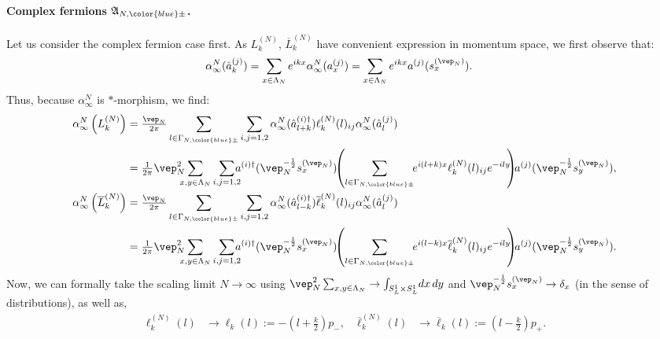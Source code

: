 \documentclass[a4paper, 11pt]{article}
\newcommand{\fA}{\mathfrak{A}}\newcommand{\cA}{\mathcal{A}}\newcommand{\dA}{\mathds{A}}\newcommand{\sA}{\mathscr{A}}
\DeclareMathOperator{\1}{\mathds{1}}
\begin{document}
\paragraph{Complex fermions $\fA_{N,{\color{blue}\pm}}$.}
Let us consider the complex fermion case first. As $L^{(N)}_{k}$, $\overline{L}^{(N)}_{k}$ have convenient expression in momentum space, we first observe that:
\begin{align}
\label{eq:rglimalgFT}
\alpha^{N}_{\infty}(\hat{a}^{(j)}_{k}) & = \sum_{x\in\Lambda_{N}}e^{ikx}\alpha^{N}_{\infty}(a^{(j)}_{x}) = \sum_{x\in\Lambda_{N}}e^{ikx}a^{(j)}(s^{(\vep_{N})}_{x}).
\end{align}
Thus, because $\alpha^{N}_{\infty}$ is $*$-morphism, we find:
\begin{align}
\label{eq:limrglatvira}
\alpha^{N}_{\infty}\left(L^{(N)}_{k}\right) & = \tfrac{\vep_{N}}{2\pi}\sum_{l\in\Gamma_{N,{\color{blue}\pm}}}\sum_{i,j=1,2}\alpha^{N}_{\infty}(\hat{a}^{(i)\dag}_{l+k})\ell^{(N)}_{k}(l)_{ij}\alpha^{N}_{\infty}(\hat{a}^{(j)}_{l}) \\ \nonumber
 & = \tfrac{1}{2\pi}\vep_{N}^{2}\!\!\!\!\sum_{x,y\in\Lambda_{N}}\sum_{i,j=1,2}\!\!\!\!a^{(i)\dag}(\vep_{N}^{-\frac{1}{2}} s^{(\vep_{N})}_{x})\!\!\left(\sum_{l\in\Gamma_{N,{\color{blue}\pm}}} \!\!e^{i(l+k)x}\ell^{(N)}_{k}(l)_{ij}e^{-ily} \!\!\right) \!\!a^{(j)}(\vep_{N}^{-\frac{1}{2}} s^{(\vep_{N})}_{y}),\\ \nonumber
\alpha^{N}_{\infty}\left(\overline{L}^{(N)}_{k}\right) & = \tfrac{\vep_{N}}{2\pi}\sum_{l\in\Gamma_{N,{\color{blue}\pm}}}\sum_{i,j=1,2}\alpha^{N}_{\infty}(\hat{a}^{(i)\dag}_{l-k})\overline{\ell}^{(N)}_{k}(l)_{ij}\alpha^{N}_{\infty}(\hat{a}^{(j)}_{l}) \\ \nonumber
 & = \tfrac{1}{2\pi}\vep_{N}^{2}\!\!\!\!\sum_{x,y\in\Lambda_{N}}\sum_{i,j=1,2}\!\!\!\!a^{(i)\dag}(\vep_{N}^{-\frac{1}{2}} s^{(\vep_{N})}_{x}) \!\!\left(\sum_{l\in\Gamma_{N,{\color{blue}\pm}}} \!\!e^{i(l-k)x}\overline{\ell}^{(N)}_{k}(l)_{ij}e^{-ily} \!\!\right) \!\!a^{(j)}(\vep_{N}^{-\frac{1}{2}} s^{(\vep_{N})}_{y}).
\end{align}
Now, we can formally take the scaling limit $N\rightarrow\infty$ using $\vep_{N}^{2}\sum_{x,y\in\Lambda_{N}}\rightarrow\int_{S^{1}_{L}\times S^{1}_{L}}\!dx\!\ dy$ and $\vep_{N}^{-\frac{1}{2}}s^{(\vep_{N})}_{x}\rightarrow\delta_{x}$ (in the sense of distributions), as well as,
\begin{align}
\label{eq:scalelim1pvira}
 \ell^{(N)}_{k}(l) & \rightarrow \ell_{k}(l) := -(l+\tfrac{k}{2})p_{-}, & \overline{\ell}^{(N)}_{k}(l) & \rightarrow \overline{\ell}_{k}(l) := (l-\tfrac{k}{2})p_{+}.
\end{align}
\end{document}
